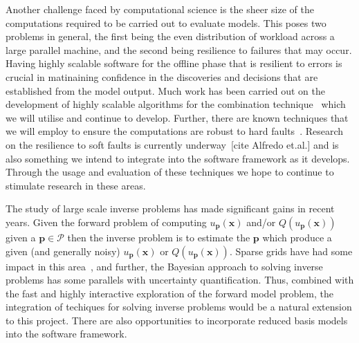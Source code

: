 \documentclass[a4paper,fontsize=12pt]{scrartcl}
\begin{document}
Another challenge faced by computational science is the sheer size of
the computations required to be carried out to evaluate models. This
poses two problems in general, the first being the even distribution
of workload across a large parallel machine, and the second being
resilience to failures that may occur. Having highly scalable software
for the offline phase that is resilient to errors is crucial in
matinaining confidence in the discoveries and decisions that are
established from the model output. Much work has been carried out on
the development of highly scalable algorithms for the combination
technique~\parencite{StrazdinsEtal2015} which we will utilise and
continue to develop. Further, there are known techniques that we will
employ to ensure the computations are robust to hard
faults~\parencite{HardingHLS2015,AliEtal2015}. Research on the
resilience to soft faults is currently underway~[cite Alfredo et.al.]
and is also something we intend to integrate into the software
framework as it develops. Through the usage and evaluation of these
techniques we hope to continue to stimulate research in these areas.

The study of large scale inverse problems has made significant gains
in recent years. Given the forward problem of computing
$u_{\mathbf{p}}(\mathbf{x})$ and/or $Q(u_{\mathbf{p}}(\mathbf{x}))$
given a $\mathbf{p}\in\mathcal{P}$ then the inverse problem is to
estimate the $\mathbf{p}$ which produce a given (and generally noisy)
$u_{\mathbf{p}}(\mathbf{x})$ or $Q(u_{\mathbf{p}}(\mathbf{x}))$.
Sparse grids have had some impact in this
area~\parencite{Zabaras2010}, and further, the Bayesian approach to
solving inverse problems has some parallels with uncertainty
quantification. Thus, combined with the fast and highly interactive
exploration of the forward model problem, the integration of techiques
for solving inverse problems would be a natural extension to this
project. There are also opportunities to incorporate reduced basis
models~\parencite{LiebermanEtal2010,Peherstorfer2013,ChenSchwab2015}
into the software framework.


\end{document}
